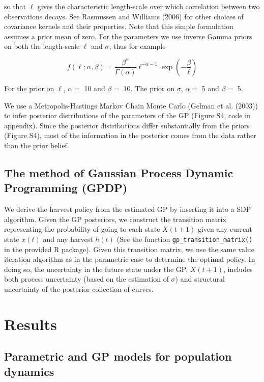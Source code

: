 \documentclass[author-year, 12pt,review]{components/elsarticle} %
\begin{document}
so that $\ell$ gives the characteristic length-scale over which
correlation between two observations decays. See Rasmussen and Williams
(2006) for other choices of covariance kernels and their properties.
Note that this simple formulation assumes a prior mean of zero. For the
parameters we use inverse Gamma priors on both the length-scale $\ell$
and $\sigma$, thus for example

\begin{equation}
f(\ell; \alpha, \beta) = \frac{\beta^\alpha}{\Gamma(\alpha)} \ell^{-\alpha - 1}\exp\left(-\frac{\beta}{\ell}\right)
\end{equation}

For the prior on $\ell$, $\alpha = $ 10 and $\beta = $ 10. The prior on
$\sigma$, $\alpha = $ 5 and $\beta = $ 5.

We use a Metropolis-Hastings Markov Chain Monte Carlo (Gelman et al.
(2003)) to infer posterior distributions of the parameters of the GP
(Figure S4, code in appendix). Since the posterior distributions differ
substantially from the priors (Figure S4), most of the information in
the posterior comes from the data rather than the prior belief.

\subsection{The method of Gaussian Process Dynamic Programming
(GPDP)}\label{the-method-of-gaussian-process-dynamic-programming-gpdp}

We derive the harvest policy from the estimated GP by inserting it into
a SDP algorithm. Given the GP posteriors, we construct the transition
matrix representing the probability of going to each state $X(t+1)$
given any current state $x(t)$ and any harvest $h(t)$ (See the function
\texttt{gp\_transition\_matrix()} in the provided R package). Given this
transition matrix, we use the same value iteration algorithm as in the
parametric case to determine the optimal policy. In doing so, the
uncertainty in the future state under the GP, $X(t+1)$, includes both
process uncertainty (based on the estimation of $\sigma$) and structural
uncertainty of the posterior collection of curves.

\section{Results}\label{results}

\subsection{Parametric and GP models for population
dynamics}\label{parametric-and-gp-models-for-population-dynamics}
\end{document}
